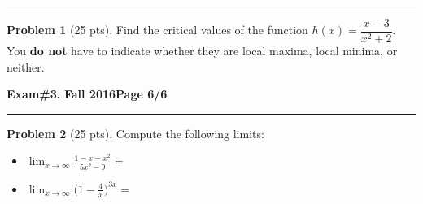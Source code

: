 \documentclass[12pt]{article}
\theoremstyle{definition}
\newtheorem{problem}{Problem}
\begin{document}
\hrule
\begin{problem}[25 pts]
Find the critical values of the function $h(x)=\dfrac{x-3}{x^2+2}$.  You \textbf{do not} have to indicate whether they are local maxima, local minima, or neither.

\vspace{10cm}

\begin{flushright}
\end{flushright}
\end{problem}

\newpage

\hfill{\large\bf Exam\#3.}\hfill{\large\bf
  Fall 2016}\hfill{\large\bf Page 6/6}\hrule

\bigskip
\begin{problem}[25 pts] 
Compute the following limits:
\begin{itemize}
  \item[] [10 pts] $\displaystyle{\lim_{x\to\infty} \frac{1-x-x^2}{5x^2-9}} = $ \framebox[2cm][c]{\textcolor{white}{$\bigg ( $}}
  \vspace{3cm}
  \item[] [15 pts] $\displaystyle{\lim_{x\to\infty} \Big(1-\frac{4}{x} \Big)^{3x}} = $ \framebox[2cm][c]{\textcolor{white}{$\bigg ( $}}
\end{itemize}
\end{problem}
\end{document}
